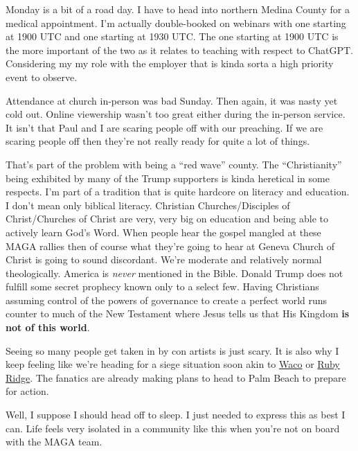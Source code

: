 Monday is a bit of a road day. I have to head into northern Medina
County for a medical appointment. I'm actually double-booked on webinars
with one starting at 1900 UTC and one starting at 1930 UTC. The one
starting at 1900 UTC is the more important of the two as it relates to
teaching with respect to ChatGPT. Considering my my role with the
employer that is kinda sorta a high priority event to observe.

Attendance at church in-person was bad Sunday. Then again, it was nasty
yet cold out. Online viewership wasn't too great either during the
in-person service. It isn't that Paul and I are scaring people off with
our preaching. If we are scaring people off then they're not really
ready for quite a lot of things.

That's part of the problem with being a ``red wave'' county. The
``Christianity'' being exhibited by many of the Trump supporters is
kinda heretical in some respects. I'm part of a tradition that is quite
hardcore on literacy and education. I don't mean only biblical literacy.
Christian Churches/Disciples of Christ/Churches of Christ are very, very
big on education and being able to actively learn God's Word. When
people hear the gospel mangled at these MAGA rallies then of course what
they're going to hear at Geneva Church of Christ is going to sound
discordant. We're moderate and relatively normal theologically. America
is \emph{never} mentioned in the Bible. Donald Trump does not fulfill
some secret prophecy known only to a select few. Having Christians
assuming control of the powers of governance to create a perfect world
runs counter to much of the New Testament where Jesus tells us that His
Kingdom \textbf{is not of this world}.

Seeing so many people get taken in by con artists is just scary. It is
also why I keep feeling like we're heading for a siege situation soon
akin to
\href{https://en.wikipedia.org/w/index.php?title=Waco_siege&oldid=1145378099}{Waco}
or
\href{https://en.wikipedia.org/w/index.php?title=Ruby_Ridge&oldid=1145007827}{Ruby
Ridge}. The fanatics are already making plans to head to Palm Beach to
prepare for action.

Well, I suppose I should head off to sleep. I just needed to express
this as best I can. Life feels very isolated in a community like this
when you're not on board with the MAGA team.
